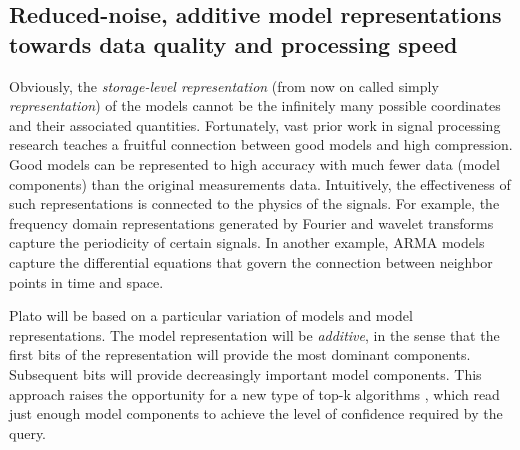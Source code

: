 \subsection{Reduced-noise, additive model representations towards data quality and processing speed}
\label{sec:reduced-noise-additive}
Obviously, the {\em storage-level representation} (from now on called simply {\em representation}) of the models cannot be the infinitely many possible coordinates and their associated quantities. Fortunately, vast prior work in signal processing research teaches a fruitful connection between good models and high compression. Good models can be represented to high accuracy with much fewer data (model components) than the original measurements data. 
Intuitively, the effectiveness of such representations is connected to the physics of the signals. For example, the frequency domain representations generated by Fourier and wavelet transforms capture the periodicity of certain signals. In another example, ARMA models capture the differential equations that govern the connection between neighbor points in time and space.

Plato will be based on a particular variation of models and model representations. The model representation will be {\em additive}, in the sense that the first bits of the representation will provide the most dominant components. Subsequent bits will provide decreasingly important model components. This approach raises the opportunity for a new type of top-k algorithms \cite{Fagin}, which read just enough model components to achieve the level of confidence required by the query.

